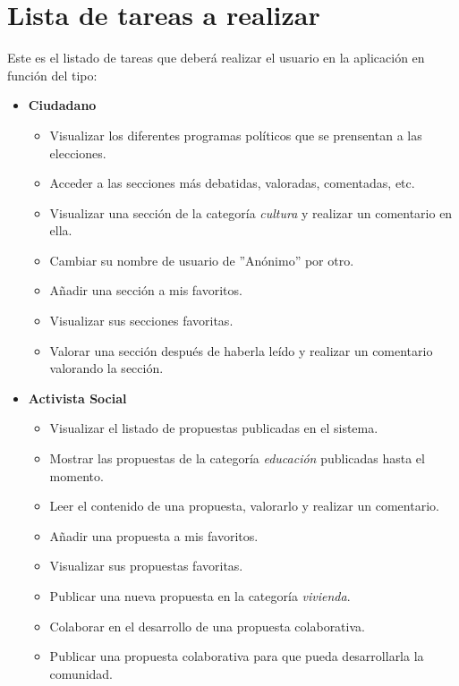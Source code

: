 \section{Lista de tareas a realizar}

Este es el listado de tareas que deberá realizar el usuario en la aplicación en función del tipo:

\begin{itemize}
 \item \textbf{Ciudadano}
 \begin{itemize}
  \item Visualizar los diferentes programas políticos que se prensentan a las elecciones.
  \item Acceder a las secciones más debatidas, valoradas, comentadas, etc.
  \item Visualizar una sección de la categoría \textit{cultura} y realizar un comentario en ella.
  \item Cambiar su nombre de usuario de ''Anónimo'' por otro.
  \item Añadir una sección a mis favoritos.
  \item Visualizar sus secciones favoritas.
  \item Valorar una sección después de haberla leído y realizar un comentario valorando la sección.
 \end{itemize}
\end{itemize}

\begin{itemize}
 \item \textbf{Activista Social}
 \begin{itemize}
  \item Visualizar el listado de propuestas publicadas en el sistema.
  \item Mostrar las propuestas de la categoría \textit{educación} publicadas hasta el momento.
  \item Leer el contenido de una propuesta, valorarlo y realizar un comentario.
  \item Añadir una propuesta a mis favoritos.
  \item Visualizar sus propuestas favoritas.
  \item Publicar una nueva propuesta en la categoría \textit{vivienda}.
  \item Colaborar en el desarrollo de una propuesta colaborativa.
  \item Publicar una propuesta colaborativa para que pueda desarrollarla la comunidad.
 \end{itemize}
\end{itemize}

